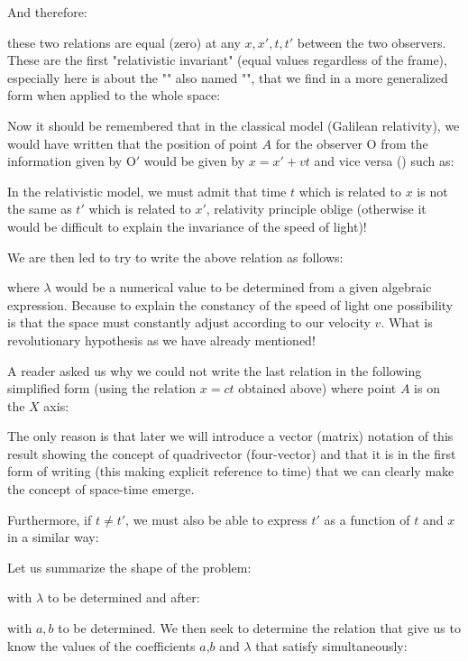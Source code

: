 		And therefore:
		
		these two relations are equal (zero) at any $x, x', t, t'$ between the two observers. These are the first "relativistic invariant" (equal values regardless of the frame), especially here is about the "" also named "", that we find in a more generalized form when applied to the whole space:
		
		Now it should be remembered that in the classical model (Galilean relativity), we would have written that the position of point $A$ for the observer $\text{O}$ from the information given by $\text{O}'$ would be given by $x=x'+vt$ and vice versa () such as:
		
		In the relativistic model, we must admit that time $t$ which is related to $x$ is not the same as $t'$ which is related to $x'$, relativity principle oblige (otherwise it would be difficult to explain the invariance of the speed of light)!
		
		We are then led to try to write the above relation as follows:
		
		where $\lambda$ would be a numerical value to be determined from a given algebraic expression. Because to explain the constancy of the speed of light one possibility is that the space must constantly adjust according to our velocity $v$. What is revolutionary hypothesis as we have already mentioned!
	\begin{tcolorbox}[title=Remark,colframe=black,arc=10pt]
	A reader asked us why we could not write the last relation in the following simplified form (using the relation $x = ct$ obtained above) where point $A$ is on the $X$ axis:
	
	The only reason is that later we will introduce a vector (matrix) notation of this result showing the concept of quadrivector (four-vector) and that it is in the first form of writing (this making explicit reference to time) that we can clearly make the concept of space-time emerge.
	\end{tcolorbox}
	Furthermore, if $t\neq t'$, we must also be able to express $t'$ as a function of $t$ and $x$ in a similar way:
	
	Let us summarize the shape of the problem:
	
	with $\lambda$ to be determined and after:
	
	with $a,b$ to be determined.
	We then seek to determine the relation that give us to know the values of the coefficients $a$,$b$ and $\lambda$ that satisfy simultaneously:
	
